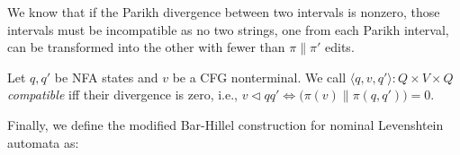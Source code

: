 We know that if the Parikh divergence between two intervals is nonzero, those intervals must be incompatible as no two strings, one from each Parikh interval, can be transformed into the other with fewer than $\pi \parallel \pi'$ edits.

\begin{definition}
  Let $q, q'$ be NFA states and $v$ be a CFG nonterminal. We call $\langle q, v, q'\rangle: Q\times V\times Q$ \textit{compatible} iff their divergence is zero, i.e., $v \lhd qq' \iff \big(\pi(v) \parallel \pi(q, q')\big) = 0$.
\end{definition}

Finally, we define the modified Bar-Hillel construction for nominal Levenshtein automata as:\vspace{-2pt}

\vspace{2pt}

